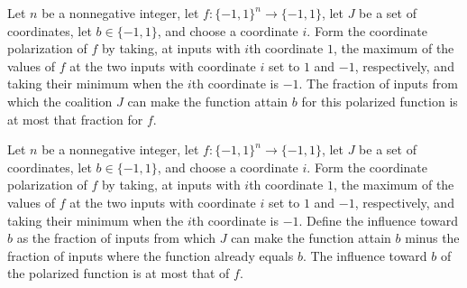 \begin{theorem}
\label{FABL.coalitionSuccessProbability_coordinatePolarization_le}
\leanok
{}
Let $n$ be a nonnegative integer, let $f:\{-1,1\}^n\to\{-1,1\}$, let $J$ be a set of
coordinates, let $b\in\{-1,1\}$, and choose a coordinate $i$. Form the coordinate
polarization of $f$ by taking, at inputs with $i$th coordinate $1$, the maximum of the
values of $f$ at the two inputs with coordinate $i$ set to $1$ and $-1$, respectively,
and taking their minimum when the $i$th coordinate is $-1$. The fraction of inputs from
which the coalition $J$ can make the function attain $b$ for this polarized function is
at most that fraction for $f$.
\end{theorem}

\begin{theorem}
\label{FABL.coalitionalInfluenceToward_coordinatePolarization_le}
\leanok
{}
Let $n$ be a nonnegative integer, let $f:\{-1,1\}^n\to\{-1,1\}$, let $J$ be a set of
coordinates, let $b\in\{-1,1\}$, and choose a coordinate $i$. Form the coordinate
polarization of $f$ by taking, at inputs with $i$th coordinate $1$, the maximum of the
values of $f$ at the two inputs with coordinate $i$ set to $1$ and $-1$, respectively,
and taking their minimum when the $i$th coordinate is $-1$. Define the influence toward
$b$ as the fraction of inputs from which $J$ can make the function attain $b$ minus the
fraction of inputs where the function already equals $b$. The influence toward $b$ of
the polarized function is at most that of $f$.
\end{theorem}

